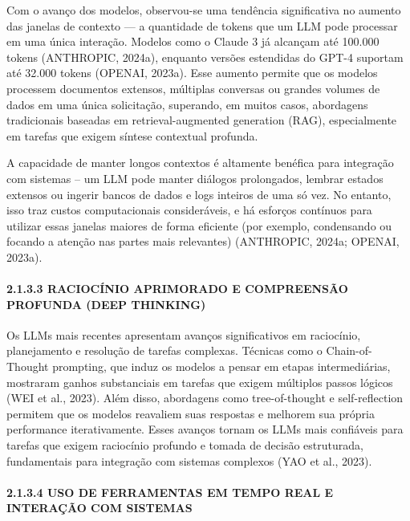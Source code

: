 \documentclass[
]{article}
\begin{document}
Com o avanço dos modelos, observou-se uma tendência significativa no
aumento das janelas de contexto --- a quantidade de tokens que um LLM
pode processar em uma única interação. Modelos como o Claude 3 já
alcançam até 100.000 tokens (ANTHROPIC, 2024a), enquanto versões
estendidas do GPT-4 suportam até 32.000 tokens (OPENAI, 2023a). Esse
aumento permite que os modelos processem documentos extensos, múltiplas
conversas ou grandes volumes de dados em uma única solicitação,
superando, em muitos casos, abordagens tradicionais baseadas em
retrieval-augmented generation (RAG), especialmente em tarefas que
exigem síntese contextual profunda.

A capacidade de manter longos contextos é altamente benéfica para
integração com sistemas -- um LLM pode manter diálogos prolongados,
lembrar estados extensos ou ingerir bancos de dados e logs inteiros de
uma só vez. No entanto, isso traz custos computacionais consideráveis, e
há esforços contínuos para utilizar essas janelas maiores de forma
eficiente (por exemplo, condensando ou focando a atenção nas partes mais
relevantes) (ANTHROPIC, 2024a; OPENAI, 2023a).

\paragraph{2.1.3.3 RACIOCÍNIO APRIMORADO E COMPREENSÃO PROFUNDA (DEEP
THINKING)}\label{raciocuxednio-aprimorado-e-compreensuxe3o-profunda-deep-thinking}

Os LLMs mais recentes apresentam avanços significativos em raciocínio,
planejamento e resolução de tarefas complexas. Técnicas como o
Chain-of-Thought prompting, que induz os modelos a pensar em etapas
intermediárias, mostraram ganhos substanciais em tarefas que exigem
múltiplos passos lógicos (WEI et al., 2023). Além disso, abordagens como
tree-of-thought e self-reflection permitem que os modelos reavaliem suas
respostas e melhorem sua própria performance iterativamente. Esses
avanços tornam os LLMs mais confiáveis para tarefas que exigem
raciocínio profundo e tomada de decisão estruturada, fundamentais para
integração com sistemas complexos (YAO et al., 2023).

\paragraph{2.1.3.4 USO DE FERRAMENTAS EM TEMPO REAL E INTERAÇÃO COM
SISTEMAS}\label{uso-de-ferramentas-em-tempo-real-e-interauxe7uxe3o-com-sistemas}
\end{document}
